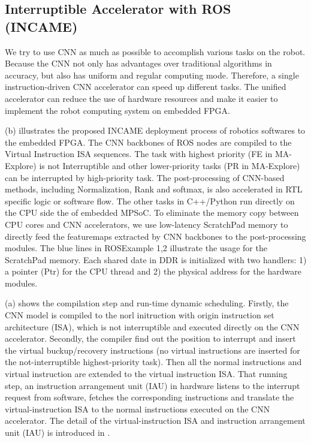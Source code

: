 \subsection{ Interruptible Accelerator with ROS (INCAME) }

We try to use CNN as much as possible to accomplish various tasks on the robot. Because the CNN not only has advantages over traditional algorithms in accuracy, but also has uniform and regular computing mode. Therefore, a single instruction-driven CNN accelerator can speed up different tasks. The unified accelerator can reduce the use of hardware resources and make it easier to implement the robot computing system on embedded FPGA.

(b) illustrates the proposed INCAME deployment process of robotics softwares to the embedded FPGA. The CNN backbones of ROS nodes are compiled to the Virtual Instruction ISA sequences. The task with highest priority (FE in MA-Explore) is not Interruptible and other lower-priority tasks (PR in MA-Explore) can be interrupted by high-priority task. The post-processing of CNN-based methods, including Normalization, Rank and softmax, is also accelerated in RTL specific logic or software flow. The other tasks in C++/Python run directly on the CPU side the of embedded MPSoC\cite{MPSoC}. To eliminate the memory copy between CPU cores and CNN accelerators, we use low-latency ScratchPad memory \cite{Banakar2002Scratchpad} to directly feed the featuremaps extracted by CNN backbones to the post-processing modules. The blue lines in  ROSExample 1,2 illustrate the usage for the ScratchPad memory. Each shared date in DDR is initialized with two handlers: 1) a pointer (Ptr) for the CPU thread and 2) the physical address for the hardware modules.

(a) shows the compilation step and run-time dynamic scheduling. Firstly, the CNN model is compiled to the norl initruction with origin instruction set architecture (ISA), which is not interruptible and executed directly on the CNN accelerator. Secondly, the compiler find out the position to interrupt and insert the virtual buckup/recovery instructions (no virtual instructions are inserted for the not-interruptible highest-priority task). Then all the normal instructions and virtual instruction are extended to the virtual instruction ISA. That running step, an instruction arrangement unit (IAU) in hardware listens to the interrupt request from software, fetches the corresponding instructions and translate the virtual-instruction ISA to the normal instructions executed on the CNN accelerator. The detail of the virtual-instruction ISA and instruction arrangement unit (IAU) is introduced in .

